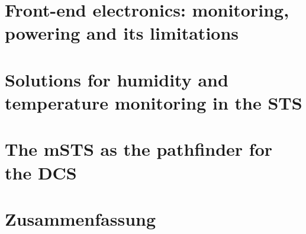 \chapter{Front-end electronics: monitoring, powering and its limitations}
\label{chap:containers}



\chapter{Solutions for humidity and temperature monitoring in the STS}
\label{chap:sts}



\chapter{The mSTS as the pathfinder for the DCS}
\label{chap:msts}
        


%
%
%
\chapter*{Zusammenfassung}

%

\renewcommand\listfigurename{List of Figures}
\listoffigures
{}
\renewcommand\listtablename{List of Tables}
\listoftables

{}
\printbibliography
\printglossaries


